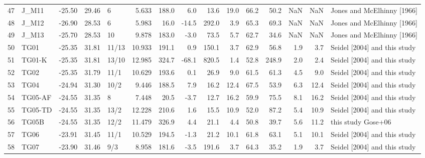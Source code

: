 \documentclass{article}
\begin{document}
{\begin{tabular}{llrrlrrrrrrrrrl}
47 &             J\_M11 &        -25.50 &          29.46 &      6 &   5.633 &  188.0 &   6.0 &   13.6 &  19.0 &  66.2 &   50.2 &   NaN &   NaN &     Jones and McElhinny [1966] \\
48 &             J\_M12 &        -26.90 &          28.53 &      6 &   5.983 &   16.0 & -14.5 &  292.0 &   3.9 &  65.3 &   69.3 &   NaN &   NaN &     Jones and McElhinny [1966] \\
49 &             J\_M13 &        -25.70 &          28.53 &     10 &   9.878 &  183.0 &  -3.0 &   73.5 &   5.7 &  62.7 &   34.6 &   NaN &   NaN &     Jones and McElhinny [1966] \\
50 &              TG01 &        -25.35 &          31.81 &  11/13 &  10.933 &  191.1 &   0.9 &  150.1 &   3.7 &  62.9 &   56.8 &   1.9 &   3.7 &   Seidel [2004] and this study \\
51 &            TG01-K &        -25.35 &          31.81 &  13/10 &  12.985 &  324.7 & -68.1 &  820.5 &   1.4 &  52.8 &  248.9 &   2.0 &   2.4 &   Seidel [2004] and this study \\
52 &              TG02 &        -25.35 &          31.79 &   11/1 &  10.629 &  193.6 &   0.1 &   26.9 &   9.0 &  61.5 &   61.3 &   4.5 &   9.0 &   Seidel [2004] and this study \\
53 &              TG04 &        -24.94 &          31.30 &   10/2 &   9.446 &  188.5 &   7.9 &   16.2 &  12.4 &  67.5 &   53.9 &   6.3 &  12.4 &   Seidel [2004] and this study \\
54 &           TG05-AF &        -24.55 &          31.35 &      8 &   7.448 &   20.5 &  -3.7 &   12.7 &  16.2 &  59.9 &   75.5 &   8.1 &  16.2 &   Seidel [2004] and this study \\
55 &           TG05-TD &        -24.55 &          31.35 &   13/2 &  12.228 &  210.6 &   1.6 &   15.5 &  10.9 &  52.0 &   87.2 &   5.4 &  10.9 &   Seidel [2004] and this study \\
56 &             TG05B &        -24.55 &          31.35 &   12/2 &  11.479 &  326.9 &   4.4 &   21.1 &   4.4 &  50.8 &   39.7 &   5.6 &  11.2 &             this study Gose+06 \\
57 &              TG06 &        -23.91 &          31.45 &   11/1 &  10.529 &  194.5 &  -1.3 &   21.2 &  10.1 &  61.8 &   63.1 &   5.1 &  10.1 &   Seidel [2004] and this study \\
58 &              TG07 &        -23.90 &          31.46 &    9/3 &   8.958 &  181.6 &  -3.5 &  191.6 &   3.7 &  64.3 &   35.2 &   1.9 &   3.7 &   Seidel [2004] and this study \\

\end{tabular}}
\end{document}
